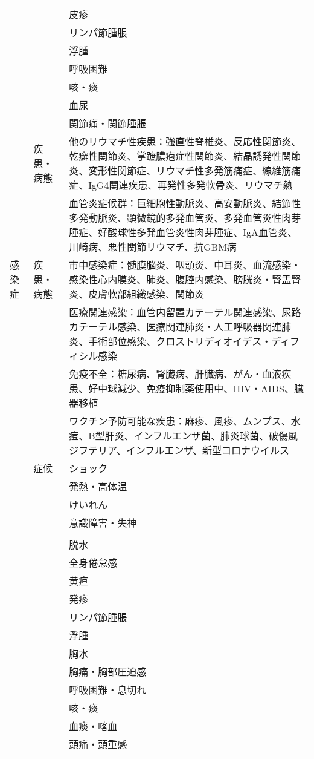 \documentclass[
]{ltjsarticle}
\begin{document}
\begin{xltabular}{\linewidth}{XXX}
 &  & 皮疹 \\
 &  & リンパ節腫脹 \\
 &  & 浮腫 \\
 &  & 呼吸困難 \\
 &  & 咳・痰 \\
 &  & 血尿 \\
 &  & 関節痛・関節腫脹 \\
 & 疾患・病態 & 他のリウマチ性疾患：強直性脊椎炎、反応性関節炎、乾癬性関節炎、掌蹠膿疱症性関節炎、結晶誘発性関節炎、変形性関節症、リウマチ性多発筋痛症、線維筋痛症、IgG4関連疾患、再発性多発軟骨炎、リウマチ熱 \\
 &  & 血管炎症候群：巨細胞性動脈炎、高安動脈炎、結節性多発動脈炎、顕微鏡的多発血管炎、多発血管炎性肉芽腫症、好酸球性多発血管炎性肉芽腫症、IgA血管炎、川崎病、悪性関節リウマチ、抗GBM病 \\
感染症 & 疾患・病態 & 市中感染症：髄膜脳炎、咽頭炎、中耳炎、血流感染・感染性心内膜炎、肺炎、腹腔内感染、膀胱炎・腎盂腎炎、皮膚軟部組織感染、関節炎 \\
 &  & 医療関連感染：血管内留置カテーテル関連感染、尿路カテーテル感染、医療関連肺炎・人工呼吸器関連肺炎、手術部位感染、クロストリディオイデス・ディフィシル感染 \\
 &  & 免疫不全：糖尿病、腎臓病、肝臓病、がん・血液疾患、好中球減少、免疫抑制薬使用中、HIV・AIDS、臓器移植 \\
 &  & ワクチン予防可能な疾患：麻疹、風疹、ムンプス、水痘、B型肝炎、インフルエンザ菌、肺炎球菌、破傷風ジフテリア、インフルエンザ、新型コロナウイルス \\
 & 症候 & ショック \\
 &  & 発熱・高体温 \\
 &  & けいれん \\
 &  & 意識障害・失神 \\
 &  &  \\
 &  & 脱水 \\
 &  & 全身倦怠感 \\
 &  & 黄疸 \\
 &  & 発疹 \\
 &  & リンパ節腫脹 \\
 &  & 浮腫 \\
 &  & 胸水 \\
 &  & 胸痛・胸部圧迫感 \\
 &  & 呼吸困難・息切れ \\
 &  & 咳・痰 \\
 &  & 血痰・喀血 \\
 &  & 頭痛・頭重感 \\

\end{xltabular}
\end{document}
